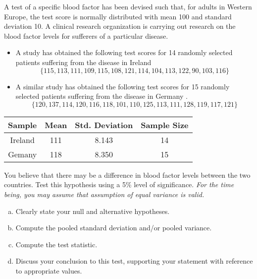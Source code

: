 
\item 
A test of a specific blood factor has been devised such that, for adults in Western Europe, the test score is normally distributed with mean 100 and standard deviation 10. 
A clinical research organization is carrying out research on the blood factor levels for sufferers of a particular disease.  

\begin{itemize}
\item A study has obtained the following test scores for 14 randomly selected patients suffering from the disease in Ireland 
\[ \{115, 113, 111, 109, 115, 108, 121, 114, 104, 113, 122, 90, 
103, 116\}\]

\item A similar study has obtained the following test scores for 15 randomly selected patients suffering from the disease in Germany .
\[\{120, 137, 114, 120, 116, 118, 101, 110, 125, 113, 111, 128, 
119, 117, 121\}\]

\end{itemize}

\begin{center}
\begin{tabular}{|c|c|c|c|} \hline 
Sample & Mean & Std. Deviation & Sample Size \\  \hline 
Ireland & 111 & 8.143 & 14 \\ \hline 
Gemany & 118 & 8.350 & 15 \\ \hline
\end{tabular} 
\end{center}
You believe that there may be a difference in blood factor levels between the two countries. Test this hypothesis using a 5\% level of significance. 
\textit{For the time being, you may assume that assumption of equal variance is valid. }
\begin{enumerate}[(a)]
\item Clearly state your null and alternative hypotheses.

\item Compute the pooled standard deviation and/or pooled variance.
\item Compute the test statistic.
\item Discuss your conclusion to this test, supporting your statement with reference to appropriate values.
\end{enumerate}


